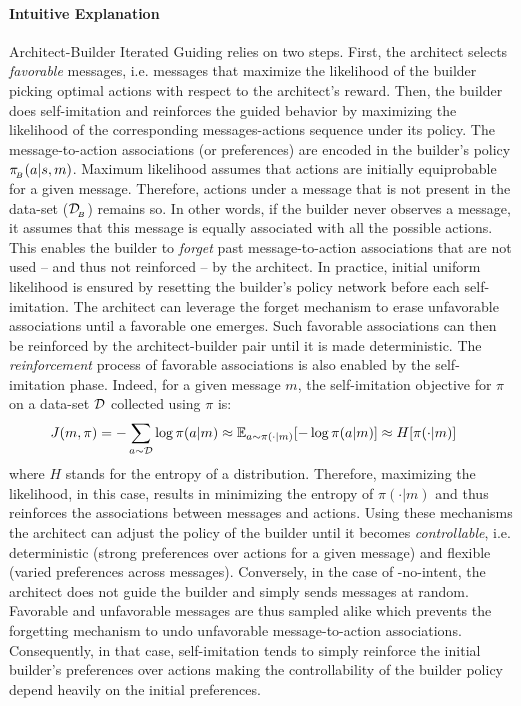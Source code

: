 \paragraph{Intuitive Explanation}
Architect-Builder Iterated Guiding relies on two steps. First, the architect selects \emph{favorable} messages, i.e. messages that maximize the likelihood of the builder picking optimal actions with respect to the architect's reward. Then, the builder does self-imitation and reinforces the guided behavior by maximizing the likelihood of the corresponding messages-actions sequence under its policy. The message-to-action associations (or preferences) are encoded in the builder's policy $\pi_{\!_B}(a|s,m)$. Maximum likelihood assumes that actions are initially equiprobable for a given message. Therefore, actions under a message that is not present in the data-set ($\mathcal{D}_{\!_B}$) remains so. In other words, if the builder never observes a message, it assumes that this message is equally associated with all the possible actions. This enables the builder to \emph{forget} past message-to-action associations that are not used -- and thus not reinforced -- by the architect. In practice, initial uniform likelihood is ensured by resetting the builder's policy network before each self-imitation. The architect can leverage the forget mechanism to erase unfavorable associations until a favorable one emerges. Such favorable associations can then be reinforced by the architect-builder pair until it is made deterministic. The \emph{reinforcement} process of favorable associations is also enabled by the self-imitation phase. Indeed, for a given message $m$, the self-imitation objective for $\pi$ on a data-set ${\mathcal{D}}$ collected using $\pi$ is: 
\begin{equation}
\begin{aligned}
    J(m, \pi) &= -\sum_{a\sim \mathcal{D}} \log\pi(a|m)\approx \mathbb{E}_{a\sim\pi(\cdot|m)}[-\log\pi(a|m)]\approx H[\pi(\cdot|m)]
    \label{eq:bc_entropy}
\end{aligned}
\end{equation}
where $H$ stands for the entropy of a distribution. Therefore, maximizing the likelihood, in this case, results in minimizing the entropy of $\pi(\cdot|m)$ and thus reinforces the associations between messages and actions. Using these mechanisms the architect can adjust the policy of the builder until it becomes \emph{controllable}, i.e. deterministic (strong preferences over actions for a given message) and flexible (varied preferences across messages). Conversely, in the case of \abig-no-intent, the architect does not guide the builder and simply sends messages at random. Favorable and unfavorable messages are thus sampled alike which prevents the forgetting mechanism to undo unfavorable message-to-action associations. Consequently, in that case, self-imitation tends to simply reinforce the initial builder's preferences over actions making the controllability of the builder policy depend heavily on the initial preferences.

